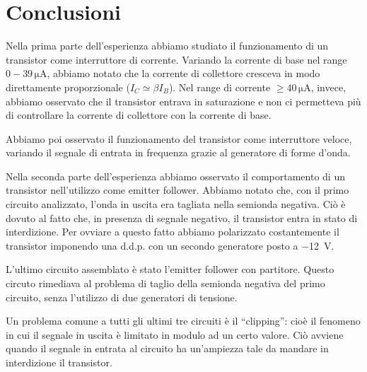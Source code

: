 \section{Conclusioni}

Nella prima parte dell'esperienza abbiamo studiato il funzionamento di un transistor come interruttore di corrente.
Variando la corrente di base nel range $0 - 39\,\si{\micro\ampere}$, abbiamo notato che la corrente di collettore cresceva in modo direttamente proporzionale ($I_C \simeq \beta I_B$).
Nel range di corrente $\geq 40 \,\si{\micro\ampere}$, invece, abbiamo osservato che il transistor entrava in saturazione e non ci permetteva più di controllare la corrente di collettore con la corrente di base.

Abbiamo poi osservato il funzionamento del transistor come interruttore veloce, variando il segnale di entrata in frequenza grazie al generatore di forme d'onda.

Nella seconda parte dell'esperienza abbiamo osservato il comportamento di un transistor nell'utilizzo come emitter follower.
Abbiamo notato che, con il primo circuito analizzato, l'onda in uscita era tagliata nella semionda negativa.
Ciò è dovuto al fatto che, in presenza di segnale negativo, il transistor entra in stato di interdizione.
Per ovviare a questo fatto abbiamo polarizzato costantemente il transistor imponendo una d.d.p. con un secondo generatore posto a \SI{-12}{\volt}.

L'ultimo circuito assemblato è stato l'emitter follower con partitore.
Questo circuto rimediava al problema di taglio della semionda negativa del primo circuito, senza l'utilizzo di due generatori di tensione.

Un problema comune a tutti gli ultimi tre circuiti è il ``clipping'': cioè il fenomeno in cui il segnale in uscita è limitato in modulo ad un certo valore.
Ciò avviene quando il segnale in entrata al circuito ha un'ampiezza tale da mandare in interdizione il transistor.